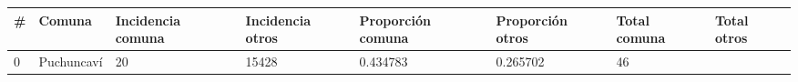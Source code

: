 \documentclass[]{article}
\begin{document}
\begin{longtable}[]{@{}llllllll@{}}
\toprule
\begin{minipage}[b]{0.03\columnwidth}\raggedright
\#\strut
\end{minipage} & \begin{minipage}[b]{0.09\columnwidth}\raggedright
Comuna\strut
\end{minipage} & \begin{minipage}[b]{0.14\columnwidth}\raggedright
Incidencia comuna\strut
\end{minipage} & \begin{minipage}[b]{0.13\columnwidth}\raggedright
Incidencia otros\strut
\end{minipage} & \begin{minipage}[b]{0.10\columnwidth}\raggedright
Proporción comuna\strut
\end{minipage} & \begin{minipage}[b]{0.09\columnwidth}\raggedright
Proporción otros\strut
\end{minipage} & \begin{minipage}[b]{0.10\columnwidth}\raggedright
Total comuna\strut
\end{minipage} & \begin{minipage}[b]{0.10\columnwidth}\raggedright
Total otros\strut
\end{minipage}\tabularnewline
\midrule
\endhead
\begin{minipage}[t]{0.03\columnwidth}\raggedright
0\strut
\end{minipage} & \begin{minipage}[t]{0.09\columnwidth}\raggedright
Puchuncaví\strut
\end{minipage} & \begin{minipage}[t]{0.14\columnwidth}\raggedright
20\strut
\end{minipage} & \begin{minipage}[t]{0.13\columnwidth}\raggedright
15428\strut
\end{minipage} & \begin{minipage}[t]{0.10\columnwidth}\raggedright
0.434783\strut
\end{minipage} & \begin{minipage}[t]{0.09\columnwidth}\raggedright
0.265702\strut
\end{minipage} & \begin{minipage}[t]{0.10\columnwidth}\raggedright
46\strut
\end{minipage} & \begin{minipage}[t]{0.10\columnwidth}\raggedright

\end{minipage}
\end{longtable}
\end{document}
